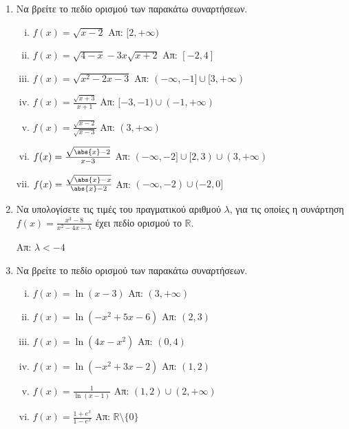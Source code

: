 \begin{enumerate}
    \item  Να βρείτε το πεδίο ορισμού των παρακάτω συναρτήσεων.
        \begin{enumerate}[i)]
            \item $ f(x) = \sqrt{x-2} $ \hfill Απ: $[2,+\infty)$
            \item $ f(x) = \sqrt{4-x} -3x \sqrt{x+2} $ \hfill Απ: $ [-2,4] $ 
            \item $ f(x) = \sqrt{x^{2}-2x-3} $ \hfill Απ: $ (-\infty,-1] 
                \cup [3,+\infty) $  
            \item $ f(x) = \frac{\sqrt{x+3}}{x+1} $ \hfill Απ: 
                $ [-3,-1) \cup (-1,+\infty)  $ 
            \item $ f(x) = \frac{\sqrt{x-2}}{\sqrt{x-3}} $ \hfill Απ:
                $ ( 3, +\infty ) $  
            \item $ f(x) = \frac{\sqrt{\abs{x}-2}}{x-3} $ \hfill 
                Απ: $ ( -\infty, -2 ] \cup [2,3) \cup (3,+\infty) $ 
            \item $ f(x) = \frac{\sqrt{\abs{x}-x}}{\abs{x}-2} $ \hfill Απ: 
                $ (-\infty,-2) \cup (-2,0] $
        \end{enumerate}

    \item Να υπολογίσετε τις τιμές του πραγματικού αριθμού $ \lambda $, για τις 
        οποίες η συνάρτηση $ f(x) = \frac{x^{3}-8}{x^{2}-4x- \lambda} $ έχει πεδίο 
        ορισμού το $ \mathbb{R} $.

        \hfill Απ: $ \lambda < -4 $ 

    \item  Να βρείτε το πεδίο ορισμού των παρακάτω συναρτήσεων.
        \begin{enumerate}[i)]
            \item $ f(x) = \ln{(x-3)} $ \hfill Απ: $(3,+\infty)$
            \item $ f(x) = \ln{(-x^{2}+5x-6)} $ \hfill Απ: $ (2,3) $
            \item $ f(x) = \ln{(4x-x^{2})} $ \hfill Απ: $ (0,4) $
            \item $ f(x) = \ln{(-x^{2}+3x-2)} $ \hfill Απ: $ (1,2) $ 
            \item $ f(x) = \frac{1}{\ln{(x-1)}} $ \hfill Απ: $ (1,2) \cup (2,+\infty) $ 
            \item $ f(x) = \frac{1+e^{x}}{1-e^{x}} $ \hfill Απ: 
                $ \mathbb{R} \setminus \{ 0 \} $ 
        \end{enumerate}


\end{enumerate}







